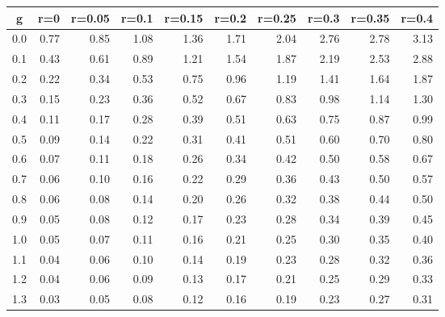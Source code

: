 %
\begin{table}[!tbp]
 \begin{center}
 \begin{tabular}{rrrrrrrrrr}\hline\hline
\multicolumn{1}{c}{g}&\multicolumn{1}{c}{r=0}&\multicolumn{1}{c}{r=0.05}&\multicolumn{1}{c}{r=0.1}&\multicolumn{1}{c}{r=0.15}&\multicolumn{1}{c}{r=0.2}&\multicolumn{1}{c}{r=0.25}&\multicolumn{1}{c}{r=0.3}&\multicolumn{1}{c}{r=0.35}&\multicolumn{1}{c}{r=0.4}\tabularnewline
\hline
0.0&0.77&0.85&1.08&1.36&1.71&2.04&2.76&2.78&3.13\tabularnewline
0.1&0.43&0.61&0.89&1.21&1.54&1.87&2.19&2.53&2.88\tabularnewline
0.2&0.22&0.34&0.53&0.75&0.96&1.19&1.41&1.64&1.87\tabularnewline
0.3&0.15&0.23&0.36&0.52&0.67&0.83&0.98&1.14&1.30\tabularnewline
0.4&0.11&0.17&0.28&0.39&0.51&0.63&0.75&0.87&0.99\tabularnewline
0.5&0.09&0.14&0.22&0.31&0.41&0.51&0.60&0.70&0.80\tabularnewline
0.6&0.07&0.11&0.18&0.26&0.34&0.42&0.50&0.58&0.67\tabularnewline
0.7&0.06&0.10&0.16&0.22&0.29&0.36&0.43&0.50&0.57\tabularnewline
0.8&0.06&0.08&0.14&0.20&0.26&0.32&0.38&0.44&0.50\tabularnewline
0.9&0.05&0.08&0.12&0.17&0.23&0.28&0.34&0.39&0.45\tabularnewline
1.0&0.05&0.07&0.11&0.16&0.21&0.25&0.30&0.35&0.40\tabularnewline
1.1&0.04&0.06&0.10&0.14&0.19&0.23&0.28&0.32&0.36\tabularnewline
1.2&0.04&0.06&0.09&0.13&0.17&0.21&0.25&0.29&0.33\tabularnewline
1.3&0.03&0.05&0.08&0.12&0.16&0.19&0.23&0.27&0.31\tabularnewline
\hline
\end{tabular}

\end{center}

\end{table}

